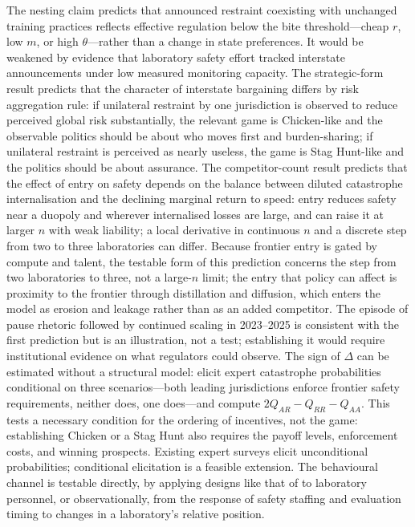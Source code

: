 \documentclass[11pt]{article}
\theoremstyle{plain}
\theoremstyle{definition}
\theoremstyle{remark}
\newcommand{\Delt}{\Delta}
\begin{document}
The nesting claim predicts that announced restraint coexisting with unchanged training practices reflects effective regulation below the bite threshold---cheap $r$, low $m$, or high $\theta$---rather than a change in state preferences. It would be weakened by evidence that laboratory safety effort tracked interstate announcements under low measured monitoring capacity. The strategic-form result predicts that the character of interstate bargaining differs by risk aggregation rule: if unilateral restraint by one jurisdiction is observed to reduce perceived global risk substantially, the relevant game is Chicken-like and the observable politics should be about who moves first and burden-sharing; if unilateral restraint is perceived as nearly useless, the game is Stag Hunt-like and the politics should be about assurance. The competitor-count result predicts that the effect of entry on safety depends on the balance between diluted catastrophe internalisation and the declining marginal return to speed: entry reduces safety near a duopoly and wherever internalised losses are large, and can raise it at larger $n$ with weak liability; a local derivative in continuous $n$ and a discrete step from two to three laboratories can differ. Because frontier entry is gated by compute and talent, the testable form of this prediction concerns the step from two laboratories to three, not a large-$n$ limit; the entry that policy can affect is proximity to the frontier through distillation and diffusion, which enters the model as erosion and leakage rather than as an added competitor. The episode of pause rhetoric followed by continued scaling in 2023--2025 is consistent with the first prediction but is an illustration, not a test; establishing it would require institutional evidence on what regulators could observe. The sign of $\Delt$ can be estimated without a structural model: elicit expert catastrophe probabilities conditional on three scenarios---both leading jurisdictions enforce frontier safety requirements, neither does, one does---and compute $2Q_{AR}-Q_{RR}-Q_{AA}$. This tests a necessary condition for the ordering of incentives, not the game: establishing Chicken or a Stag Hunt also requires the payoff levels, enforcement costs, and winning prospects. Existing expert surveys elicit unconditional probabilities; conditional elicitation is a feasible extension. The behavioural channel is testable directly, by applying designs like that of \citet{fernandez2026} to laboratory personnel, or observationally, from the response of safety staffing and evaluation timing to changes in a laboratory's relative position.
\end{document}

